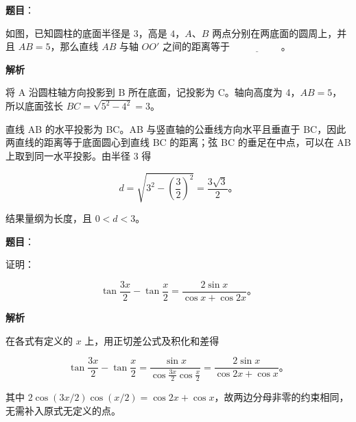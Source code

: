 \begin{answer}

\textbf{题目}：

如图，已知圆柱的底面半径是 $3$，高是 $4$，$A$、$B$ 两点分别在两底面的圆周上，并且 $AB=5$，那么直线 $AB$ 与轴 $OO'$ 之间的距离等于 $\underline{\hspace{5em}}$。
\nopagebreak[4]
\begin{center}\end{center}
\nopagebreak[4]
\textbf{解析}

将 A 沿圆柱轴方向投影到 B 所在底面，记投影为 C。轴向高度为 4，$AB=5$，所以底面弦长 $BC=\sqrt{5^2-4^2}=3$。

直线 AB 的水平投影为 BC。AB 与竖直轴的公垂线方向水平且垂直于 BC，因此两直线的距离等于底面圆心到直线 BC 的距离；弦 BC 的垂足在中点，可以在 AB 上取到同一水平投影。由半径 3 得

\nopagebreak[4]
\[
d=\sqrt{3^2-\left(\frac32\right)^2}=\frac{3\sqrt3}{2}\text{。}
\]

结果量纲为长度，且 $0<d<3$。


\end{answer}
\begin{answer}

\textbf{题目}：

证明：

\nopagebreak[4]
\[
\tan\frac{3x}{2}-\tan\frac{x}{2}=\frac{2\sin x}{\cos x+\cos2x}\text{。}
\]

\long{}
\long{}
\long\edef\gkcurrentedition{\gkheadR}
\ifx\gkcurrentedition\gkquestionedition
\Needspace{0.70\textheight}
\else
\ifx\gkcurrentedition\gkshortedition
\Needspace{0.70\textheight}
\fi
\fi

\textbf{解析}

在各式有定义的 $x$ 上，用正切差公式及积化和差得

\nopagebreak[4]
\[
\tan\frac{3x}{2}-\tan\frac{x}{2}
=\frac{\sin x}{\cos\frac{3x}{2}\cos\frac{x}{2}}
=\frac{2\sin x}{\cos2x+\cos x}\text{。}
\]

其中 $2\cos(3x/2)\cos(x/2)=\cos2x+\cos x$，故两边分母非零的约束相同，无需补入原式无定义的点。


\end{answer}
